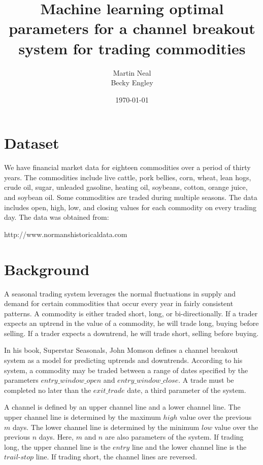 \documentclass[10pt]{article}
\title{Machine learning optimal parameters for a channel breakout system for trading
commodities}
\author{Martin Neal\\
  Becky Engley}
\date{\today}
\begin{document}
\maketitle

\section{Dataset}

We have financial market data for eighteen commodities over a period of thirty
years.  The commodities include live cattle, pork bellies, corn, wheat, lean
hogs, crude oil, sugar, unleaded gasoline, heating oil, soybeans, cotton, orange
juice, and soybean oil.  Some commodities are traded during multiple seasons.
The data includes open, high, low, and closing values for each commodity on
every trading day. The data was obtained from:

http://www.normanshistoricaldata.com

\section{Background}

A seasonal trading system leverages the normal fluctuations in supply and demand for
certain commodities that occur every year in fairly consistent patterns.  A
commodity is either traded short, long, or bi-directionally.  If a trader expects
an uptrend in the value of a commodity, he will trade long, buying before
selling.  If a trader expects a downtrend, he will trade short, selling before
buying.

In his book, Superstar Seasonals, John Momson defines a channel breakout system
as a model for predicting uptrends and downtrends.  According to his system, a
commodity may be traded between a range of dates specified by the parameters
$entry\_window\_open$ and $entry\_window\_close$.  A trade must be completed no
later than the $exit\_trade$ date, a third parameter of the system.

A channel is defined by an upper channel line and a lower channel line.  The
upper channel line is determined by the maximum $high$ value over the previous
$m$ days.  The lower channel line is determined by the minimum $low$ value
over the previous $n$ days.  Here, $m$ and $n$ are also parameters of the
system.  If trading long, the upper channel line is the $entry$ line and the lower
channel line is the $trail$-$stop$ line.  If trading short, the channel lines are
reversed.
\end{document}
